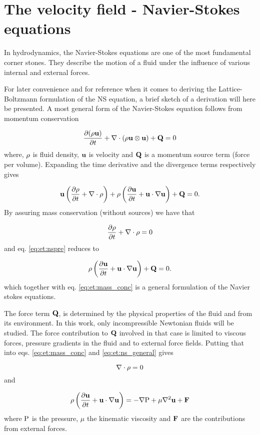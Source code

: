\section{The velocity field - Navier-Stokes equations}
In hydrodynamics, the Navier-Stokes equations are one of the most
fundamental corner stones. They describe the motion of a fluid under
the influence of various internal and external forces. 

For later convenience and for reference when it comes to deriving the
Lattice-Boltzmann formulation of the NS equation, a brief sketch of a
derivation will here be presented. A most general form of the
Navier-Stokes equation follows from momentum conservation

\begin{equation}
\dfrac{\partial (\mathrm{\rho} \mathbf{u})}{\partial t} + \nabla \cdot (\rho \mathbf{u}
\otimes \mathbf{u}) + \mathbf{Q} = 0 
\end{equation}
where, $\mathrm{\rho}$ is fluid density, $\mathbf{u}$ is velocity and $\mathbf{Q}$ is a
momentum source term (force per volume). Expanding the time
derivative and the divergence terms respectively gives
 
\begin{equation}\label{eq:et:nspre}
\mathbf{u} \left ( \dfrac{\partial \mathrm{\rho}}{\partial t} + \nabla \cdot
  \mathrm{\rho} \right ) + \mathrm{\rho} \left (\dfrac{\partial \mathbf{u}}{\partial t} +
  \mathbf{u} \cdot \nabla \mathbf{u} 
  \right ) + \mathbf{Q} = 0.
\end{equation}
By assuring mass conservation (without sources) we have that

\begin{equation}\label{eq:et:mass_conc}
 \dfrac{\partial \mathrm{\rho}}{\partial t} + \nabla \cdot
  \mathrm{\rho} = 0
\end{equation}
and eq. \eqref{eq:et:nspre} reduces to

\begin{equation}\label{eq:et:ns_general} 
\mathrm{\rho} \left (\dfrac{\partial \mathbf{u}}{\partial t} +
  \mathbf{u} \cdot \nabla \mathbf{u} 
  \right ) + \mathbf{Q} = 0.
\end{equation}
which together with eq. \eqref{eq:et:mass_conc} is a general
formulation of the Navier stokes equations. 

The force term $\mathbf{Q}$, is determined by the physical properties of the
fluid and from its environment. In this work, only incompressible
Newtonian fluids will be studied. The force contribution to $\mathbf{Q}$
involved in that case is limited to viscous forces, pressure gradients
in the fluid and to external force fields. Putting that into
eqs. \eqref{eq:et:mass_conc} and \eqref{eq:et:ns_general} gives

\begin{equation}\label{eq:et:ns_incompressible}
 \nabla \cdot \mathrm{\rho} = 0
\end{equation}
and

\begin{equation}\label{eq:et:ns_mom}
\mathrm{\rho} \left (\dfrac{\partial \mathbf{u}}{\partial t} +
  \mathbf{u} \cdot \nabla \mathbf{u} 
  \right ) = - \nabla \mathrm{P}  + \mu \nabla^2 \mathbf{u} + \mathbf{F}
\end{equation}
where $\mathrm{P}$ is the pressure, $\mu$ the kinematic viscosity and $\mathbf{F}$
are the contributions from  external forces.
